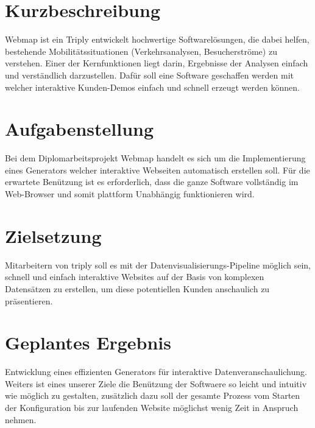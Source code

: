 \section{Kurzbeschreibung}
Webmap ist ein
Triply entwickelt hochwertige Softwarelösungen, die dabei helfen, bestehende Mobilitätssituationen (Verkehrsanalysen,
Besucherströme) zu verstehen. Einer der Kernfunktionen liegt darin, Ergebnisse der Analysen einfach und verständlich
darzustellen. Dafür soll eine Software geschaffen werden mit welcher interaktive Kunden-Demos einfach und schnell
erzeugt werden können.

\section{Aufgabenstellung}
Bei dem Diplomarbeitsprojekt Webmap handelt es sich um die Implementierung eines Generators welcher interaktive
Webseiten automatisch erstellen soll. Für die erwartete Benützung ist es erforderlich, dass die ganze Software
vollständig im Web-Browser und somit plattform Unabhängig funktionieren wird.

\section{Zielsetzung}
Mitarbeitern von triply soll es mit der Datenvisualisierungs-Pipeline möglich sein, schnell und einfach
interaktive Websites auf der Basis von komplexen Datensätzen zu erstellen, um diese potentiellen Kunden
anschaulich zu präsentieren.

\section{Geplantes Ergebnis}
Entwicklung eines effizienten Generators für interaktive Datenveranschaulichung. Weiters ist eines unserer Ziele
die Benützung der Softwaere so leicht und intuitiv wie möglich zu gestalten, zusätzlich dazu soll der gesamte
Prozess vom Starten der Konfiguration bis zur laufenden Website möglichst wenig Zeit in Anspruch nehmen.
